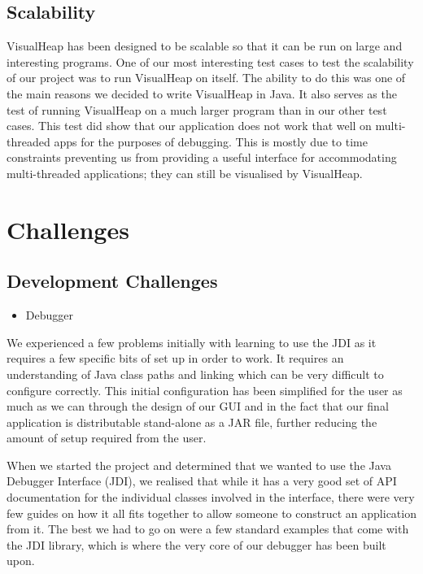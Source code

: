\documentclass[11pt, a4paper]{report}
\begin{document}
\section{Scalability}
VisualHeap has been designed to be scalable so that it can be run on large and interesting programs. One of our most interesting test cases to test the scalability of our project was to run VisualHeap on itself. The ability to do this was one of the main reasons we decided to write VisualHeap in Java. It also serves as the test of running VisualHeap on a much larger program than in our other test cases. This test did show that our application does not work that well on multi-threaded apps for the purposes of debugging. This is mostly due to time constraints preventing us from providing a useful interface for accommodating multi-threaded applications; they can still be visualised by VisualHeap.

\chapter{Challenges}

\section{Development Challenges}

\begin{itemize}
  \item Debugger
\end{itemize}

We experienced a few problems initially with learning to use the JDI as it requires a few specific bits of set up in order to work. It requires an understanding of Java class paths and linking which can be very difficult to configure correctly. This initial configuration has been simplified for the user as much as we can through the design of our GUI and in the fact that our final application is distributable stand-alone as a JAR file, further reducing the amount of setup required from the user.

When we started the project and determined that we wanted to use the Java Debugger Interface (JDI), we realised that while it has a very good set of API documentation for the individual classes involved in the interface, there were very few guides on how it all fits together to allow someone to construct an application from it. The best we had to go on were a few standard examples that come with the JDI library, which is where the very core of our debugger has been built upon.
\end{document}
